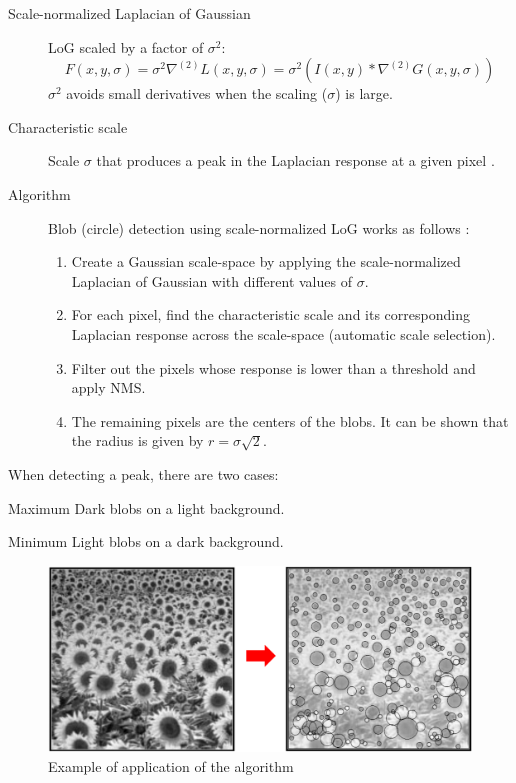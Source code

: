 \begin{description}
    \item[Scale-normalized Laplacian of Gaussian] 
        LoG scaled by a factor of $\sigma^2$:
        \[ F(x, y, \sigma) = \sigma^2 \nabla^{(2)} L(x, y, \sigma) = \sigma^2 (I(x, y) * \nabla^{(2)} G(x, y, \sigma)) \]
        $\sigma^2$ avoids small derivatives when the scaling ($\sigma$) is large.

    \item[Characteristic scale] Scale $\sigma$ that produces a peak in the Laplacian response at a given pixel \cite{slides:scale_normalized_log}.
    
    \item[Algorithm] 
        Blob (circle) detection using scale-normalized LoG works as follows \cite{slides:scale_normalized_log}:
        \begin{enumerate}
            \item Create a Gaussian scale-space by applying the scale-normalized Laplacian of Gaussian with different values of $\sigma$.
            \item For each pixel, find the characteristic scale and its corresponding Laplacian response across the scale-space (automatic scale selection).
            \item Filter out the pixels whose response is lower than a threshold and apply NMS.
            \item The remaining pixels are the centers of the blobs. 
                It can be shown that the radius is given by $r = \sigma\sqrt{2}$.
        \end{enumerate}
\end{description}


When detecting a peak, there are two cases:
\begin{descriptionlist}
    \item[Maximum] Dark blobs on a light background.
    \item[Minimum] Light blobs on a dark background.
\end{descriptionlist}

\begin{figure}[H]
    \centering
    \includegraphics[width=0.6\linewidth]{./img/LOG_blob_detection_example.png}
    \caption{Example of application of the algorithm}
\end{figure}

